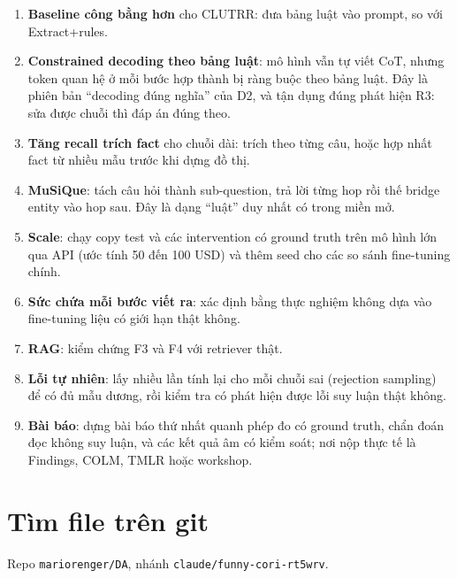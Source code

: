\documentclass[11pt]{article}
\begin{document}
\begin{enumerate}[leftmargin=*,itemsep=1pt]
\item \textbf{Baseline công bằng hơn} cho CLUTRR: đưa bảng luật vào prompt, so với Extract+rules.
\item \textbf{Constrained decoding theo bảng luật}: mô hình vẫn tự viết CoT, nhưng token quan hệ ở mỗi
  bước hợp thành bị ràng buộc theo bảng luật. Đây là phiên bản ``decoding đúng nghĩa'' của D2, và
  tận dụng đúng phát hiện R3: sửa được chuỗi thì đáp án đúng theo.
\item \textbf{Tăng recall trích fact} cho chuỗi dài: trích theo từng câu, hoặc hợp nhất fact từ nhiều
  mẫu trước khi dựng đồ thị.
\item \textbf{MuSiQue}: tách câu hỏi thành sub-question, trả lời từng hop rồi thế bridge entity vào
  hop sau. Đây là dạng ``luật'' duy nhất có trong miền mở.
\item \textbf{Scale}: chạy copy test và các intervention có ground truth trên mô hình lớn qua API (ước tính
  50 đến 100 USD) và thêm seed cho các so sánh fine-tuning chính.
\item \textbf{Sức chứa mỗi bước viết ra}: xác định bằng thực nghiệm không dựa vào fine-tuning liệu có giới
  hạn thật không.
\item \textbf{RAG}: kiểm chứng F3 và F4 với retriever thật.
\item \textbf{Lỗi tự nhiên}: lấy nhiều lần tính lại cho mỗi chuỗi sai (rejection sampling) để có đủ mẫu dương, rồi
  kiểm tra có phát hiện được lỗi suy luận thật không.
\item \textbf{Bài báo}: dựng bài báo thứ nhất quanh phép đo có ground truth, chẩn đoán đọc không suy luận,
  và các kết quả âm có kiểm soát; nơi nộp thực tế là Findings, COLM, TMLR hoặc workshop.
\end{enumerate}

\appendix
\section{Tìm file trên git}

Repo \texttt{mariorenger/DA}, nhánh \texttt{claude/funny-cori-rt5wrv}.
\end{document}
